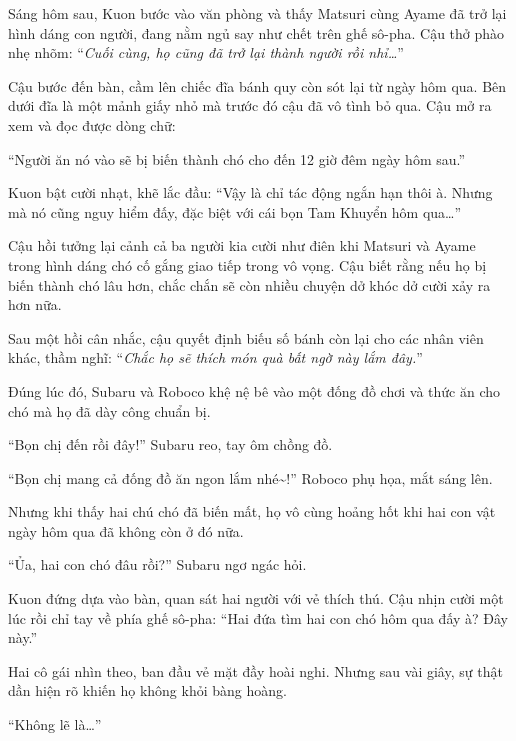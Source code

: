 \documentclass[../main.tex]{subfiles}
\begin{document}
\omk

Sáng hôm sau, Kuon bước vào văn phòng và thấy Matsuri cùng Ayame đã trở lại hình dáng con người, đang nằm ngủ say như chết trên ghế sô-pha. Cậu thở phào nhẹ nhõm: ``\textit{Cuối cùng, họ cũng đã trở lại thành người rồi nhỉ\dots}''

Cậu bước đến bàn, cầm lên chiếc đĩa bánh quy còn sót lại từ ngày hôm qua. Bên dưới đĩa là một mảnh giấy nhỏ mà trước đó cậu đã vô tình bỏ qua. Cậu mở ra xem và đọc được dòng chữ:

\begin{center}
  ``Người ăn nó vào sẽ bị biến thành chó cho đến 12 giờ đêm ngày hôm sau.''
\end{center}

Kuon bật cười nhạt, khẽ lắc đầu: ``Vậy là chỉ tác động ngắn hạn thôi à. Nhưng mà nó cũng nguy hiểm đấy, đặc biệt với cái bọn Tam Khuyển hôm qua\dots''

Cậu hồi tưởng lại cảnh cả ba người kia cười như điên khi Matsuri và Ayame trong hình dáng chó cố gắng giao tiếp trong vô vọng. Cậu biết rằng nếu họ bị biến thành chó lâu hơn, chắc chắn sẽ còn nhiều chuyện dở khóc dở cười xảy ra hơn nữa.

Sau một hồi cân nhắc, cậu quyết định biếu số bánh còn lại cho các nhân viên khác, thầm nghĩ: ``\textit{Chắc họ sẽ thích món quà bất ngờ này lắm đây.}''

Đúng lúc đó, Subaru và Roboco khệ nệ bê vào một đống đồ chơi và thức ăn cho chó mà họ đã dày công chuẩn bị.

``Bọn chị đến rồi đây!'' Subaru reo, tay ôm chồng đồ.

``Bọn chị mang cả đống đồ ăn ngon lắm nhé\~{}!'' Roboco phụ họa, mắt sáng lên.

Nhưng khi thấy hai chú chó đã biến mất, họ vô cùng hoảng hốt khi hai con vật ngày hôm qua đã không còn ở đó nữa.


``Ủa, hai con chó đâu rồi?'' Subaru ngơ ngác hỏi.

Kuon đứng dựa vào bàn, quan sát hai người với vẻ thích thú. Cậu nhịn cười một lúc rồi chỉ tay về phía ghế sô-pha: ``Hai đứa tìm hai con chó hôm qua đấy à? Đây này.''

Hai cô gái nhìn theo, ban đầu vẻ mặt đầy hoài nghi. Nhưng sau vài giây, sự thật dần hiện rõ khiến họ không khỏi bàng hoàng.

``Không lẽ là\dots''
\end{document}
